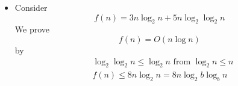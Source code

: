 \begin{frame}[allowframebreaks]
  \begin{itemize}
  \item Consider
    \begin{equation*}
    f(n)=3n \log_2 n + 5n \log_2 \log_2 n
  \end{equation*}
We prove
\begin{equation*}
f(n) = O(n\log n)
\end{equation*}
by 
\begin{equation*}
  \begin{split}
& \log_2 \log_2 n \leq \log_2 n \text{ from } \log_2 n \leq n \\
& f(n) \leq 8n \log_2 n = 8n\log_2 b\log_b n \\
\end{split}
\end{equation*}


\end{itemize}
\end{frame}
